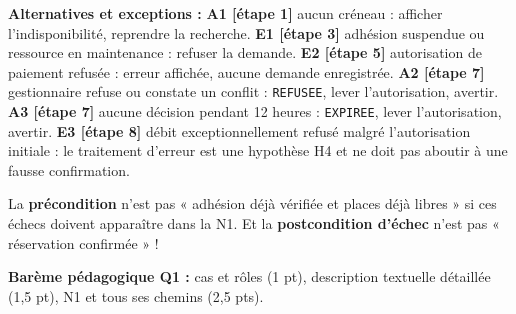 \documentclass[10pt,a4paper]{article}
\begin{document}
\textbf{Alternatives et exceptions :} \textbf{A1 [étape 1]} aucun créneau : afficher l'indisponibilité, reprendre la recherche. \textbf{E1 [étape 3]} adhésion suspendue ou ressource en maintenance : refuser la demande. \textbf{E2 [étape 5]} autorisation de paiement refusée : erreur affichée, aucune demande enregistrée. \textbf{A2 [étape 7]} gestionnaire refuse ou constate un conflit : \texttt{REFUSEE}, lever l'autorisation, avertir. \textbf{A3 [étape 7]} aucune décision pendant 12 heures : \texttt{EXPIREE}, lever l'autorisation, avertir. \textbf{E3 [étape 8]} débit exceptionnellement refusé malgré l'autorisation initiale : le traitement d'erreur est une hypothèse H4 et ne doit pas aboutir à une fausse confirmation.
\begin{warningbox}
La \textbf{précondition} n'est pas « adhésion déjà vérifiée et places déjà libres » si ces échecs doivent apparaître dans la N1. Et la \textbf{postcondition d'échec} n'est pas « réservation confirmée » !
\end{warningbox}
\textbf{Barème pédagogique Q1 :} cas et rôles (1 pt), description textuelle détaillée (1,5 pt), N1 et tous ses chemins (2,5 pts).
\end{document}
